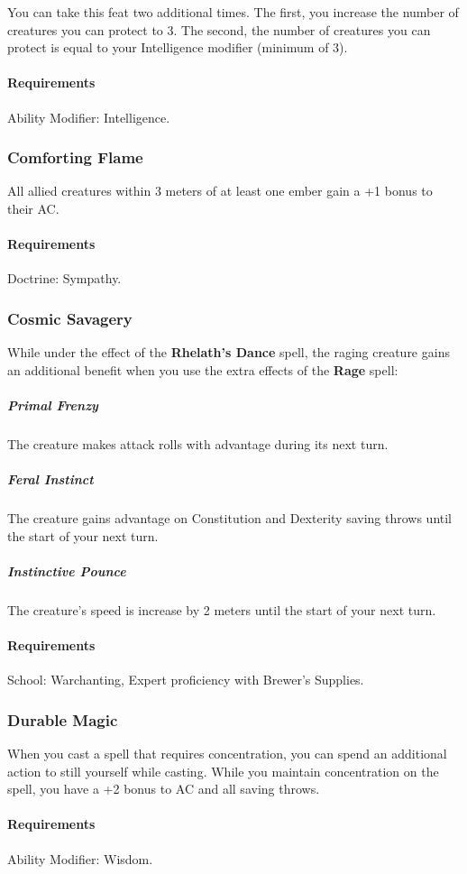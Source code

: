     You can take this feat two additional times.
    The first, you increase the number of creatures you can protect to 3.
    The second, the number of creatures you can protect is equal to your Intelligence modifier (minimum of 3).
    \paragraph{Requirements} Ability Modifier: Intelligence.
\subsubsection{Comforting Flame} \label{feat::comfortingflame}
    All allied creatures within 3 meters of at least one ember gain a +1 bonus to their AC.
    \paragraph{Requirements} Doctrine: Sympathy.
\subsubsection{Cosmic Savagery} \label{feat::cosmicsavaregy}
    While under the effect of the \textbf{Rhelath's Dance} spell, the raging creature gains an additional benefit when you use the extra effects of the \textbf{Rage} spell:

    \subparagraph{Primal Frenzy}
    The creature makes attack rolls with advantage during its next turn.
    \subparagraph{Feral Instinct}
    The creature gains advantage on Constitution and Dexterity saving throws until the start of your next turn.
    \subparagraph{Instinctive Pounce}
    The creature's speed is increase by 2 meters until the start of your next turn.
    \paragraph{Requirements} School: Warchanting, Expert proficiency with Brewer's Supplies.
\subsubsection{Durable Magic} \label{feat::durablemagic}
    When you cast a spell that requires concentration, you can spend an additional action to still yourself while casting.
    While you maintain concentration on the spell, you have a +2 bonus to AC and all saving throws.
    \paragraph{Requirements} Ability Modifier: Wisdom.
